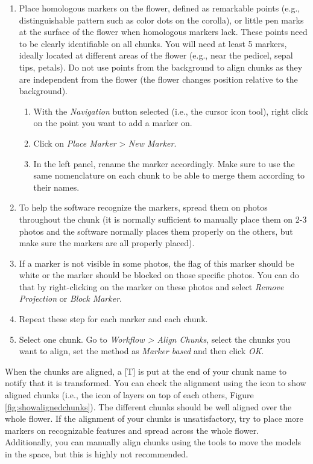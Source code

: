 \documentclass[
]{book}
\begin{document}
\begin{enumerate}
\def\labelenumi{\arabic{enumi}.}
\item
  Place homologous markers on the flower, defined as remarkable points
  (e.g., distinguishable pattern such as color dots on the
  corolla), or little pen marks at the surface of the
  flower when homologous markers lack. These points need to be
  clearly identifiable on all chunks. You will need at least 5 markers, ideally
  located at different areas of the flower
  (e.g., near the pedicel, sepal tips, petals). Do not use points
  from the background to align chunks as they are independent from the
  flower (the flower changes position relative to the background).

  \begin{enumerate}
  \def\labelenumii{\arabic{enumii}.}
  \item
    With the \emph{Navigation} button selected (i.e., the cursor icon tool),
    right click on the point you want to add a marker on.
  \item
    Click on \emph{Place Marker} \textgreater{} \emph{New Marker}.
  \item
    In the left panel, rename the marker accordingly. Make sure to use the
    same nomenclature on each chunk to be able to merge them
    according to their names.
  \end{enumerate}
\item
  To help the software recognize the markers, spread them on photos throughout
  the chunk (it is normally sufficient to manually place them on 2-3 photos and the software
  normally places them properly on the others, but make sure the markers are all
  properly placed).
\item
  If a marker is not visible in some photos, the flag of this marker should be
  white or the marker should be blocked on those specific photos. You can do
  that by right-clicking on the marker on these photos and select \emph{Remove Projection}
  or \emph{Block Marker}.
\item
  Repeat these step for each marker and each chunk.
\item
  Select one chunk. Go to \emph{Workflow \textgreater{} Align Chunks}, select the
  chunks you want to align, set the method as \emph{Marker based} and then
  click \emph{OK}.
\end{enumerate}

When the chunks are aligned, a {[}T{]} is put at the end of your chunk
name to notify that it is transformed. You can check the alignment using
the icon to show aligned chunks (i.e., the icon of layers on top of each others,
Figure \ref{fig:showalignedchunks}). The different chunks should be well
aligned over the whole flower. If the alignment of your chunks is
unsatisfactory, try to place more markers on recognizable features and
spread across the whole flower. Additionally, you can manually align
chunks using the tools to move the models in the space, but this is
highly not recommended.
\end{document}
